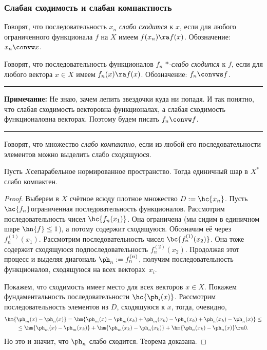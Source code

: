 \documentclass[a4paper]{article}
\newcommand{\n}[1]{^{(#1)}}
\newcommand{\comment}[1]{\par\vskip2pt\hrule\vskip2pt{\footnotesize \textbf{Примечание:} #1\par}\vskip2pt\hrule\vskip2pt}
\begin{document}
\subsubsection{Слабая сходимость и слабая компактность}

\begin{df}
Говорят, что последовательность $x_n$ \emph{слабо сходится} к $x$, если для любого ограниченного функционала $f$
на $X$ имеем $f(x_n) \ra f(x)$. Обозначение: $x_n \convw x$.
\end{df}

\begin{df}
Говорят, что последовательность функционалов $f_n$ \emph{$*$-слабо сходится} к $f$, если для любого вектора $x \in X$
имеем $f_n(x) \ra f(x)$. Обозначение: $f_n \convws f$.
\end{df}

\comment{Не знаю, зачем лепить звездочки куда ни попадя. И так понятно, что слабая сходимость векторов\т на функционалах,
а слабая сходимость функционалов\т на векторах. Поэтому будем писать $f_n \convw f$.}

\begin{df}
Говорят, что множество \emph{слабо компактно}, если из любой его последовательности элементов можно выделить
слабо сходящуюся.
\end{df}

\begin{theorem}
Пусть $X$\т сепарабельное нормированное пространство. Тогда единичный шар в $X^*$ слабо компактен.
\end{theorem}
\begin{proof}
Выберем в $X$ счётное всюду плотное множество $D := \hc{x_n}$. Пусть $\hc{f_n}$\т ограниченная
последовательность функционалов. Рассмотрим последовательность чисел $\hc{f_n(x_1)}$. Она ограничена
(мы сидим в единичном шаре $\hn{f} \le 1$), а потому содержит сходящуюся. Обозначим её через $f_n\n1(x_1)$.
Рассмотрим последовательность чисел
$\bc{f_n\n1(x_2)}$. Она тоже содержит сходящуюся подпоследовательность $f_n\n2(x_2)$.
Продолжая этот процесс и выделяя диагональ $\ph_n := f_n\n n$, получим последовательность функционалов,
сходящуюся на всех векторах~$x_i$.

Покажем, что сходимость имеет место для всех векторов $x \in X$. Покажем фундаментальность
последовательности $\hc{\ph_i(x)}$.
Рассмотрим последовательность элементов из $D$, сходящуюся к $x$, тогда, очевидно,
\begin{multline*}
\hm{\ph_m(x) - \ph_n(x)} = \hm{\ph_m(x) - \ph_m(x_k) + \ph_m(x_k) - \ph_n(x_k) + \ph_n(x_k) - \ph_n(x)} \le\\\le
\hm{\ph_m(x) - \ph_m(x_k)} + \hm{\ph_m(x_k) - \ph_n(x_k)} + \hm{\ph_n(x_k) - \ph_n(x)} \ra 0.
\end{multline*}
Но это и значит, что $\ph_n$ слабо сходится. Теорема доказана.
\end{proof}
\end{document}
